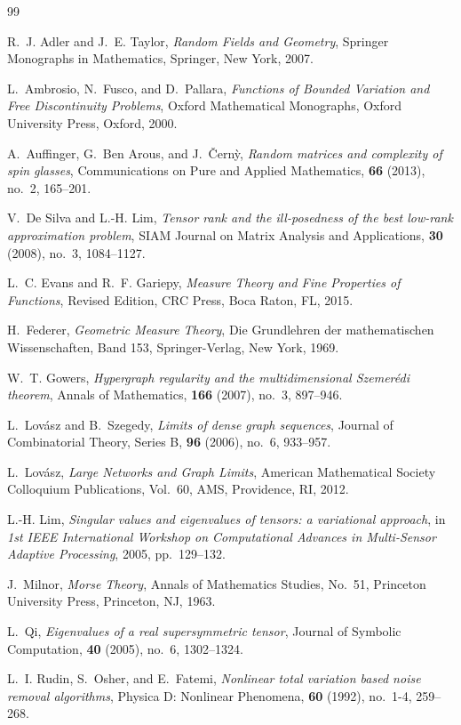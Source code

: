 \documentclass[11pt,a4paper,reqno]{amsart}
\theoremstyle{definition}
\numberwithin{equation}{section}
\begin{document}
\begin{thebibliography}{99}

R.~J. Adler and J.~E. Taylor,
\emph{Random Fields and Geometry},
Springer Monographs in Mathematics, Springer, New York, 2007.

L.~Ambrosio, N.~Fusco, and D.~Pallara,
\emph{Functions of Bounded Variation and Free Discontinuity Problems},
Oxford Mathematical Monographs, Oxford University Press, Oxford, 2000.

A.~Auffinger, G.~Ben Arous, and J.~{\v{C}}ern{\`y},
\emph{Random matrices and complexity of spin glasses},
Communications on Pure and Applied Mathematics, \textbf{66} (2013), no.~2, 165--201.

V.~De Silva and L.-H. Lim,
\emph{Tensor rank and the ill-posedness of the best low-rank approximation problem},
SIAM Journal on Matrix Analysis and Applications, \textbf{30} (2008), no.~3, 1084--1127.

L.~C. Evans and R.~F. Gariepy,
\emph{Measure Theory and Fine Properties of Functions},
Revised Edition, CRC Press, Boca Raton, FL, 2015.

H.~Federer,
\emph{Geometric Measure Theory},
Die Grundlehren der mathematischen Wissenschaften, Band 153, Springer-Verlag, New York, 1969.

W.~T. Gowers,
\emph{Hypergraph regularity and the multidimensional Szemer{\'e}di theorem},
Annals of Mathematics, \textbf{166} (2007), no.~3, 897--946.

L.~Lov{\'a}sz and B.~Szegedy,
\emph{Limits of dense graph sequences},
Journal of Combinatorial Theory, Series B, \textbf{96} (2006), no.~6, 933--957.

L.~Lov{\'a}sz,
\emph{Large Networks and Graph Limits},
American Mathematical Society Colloquium Publications, Vol.~60, AMS, Providence, RI, 2012.

L.-H. Lim,
\emph{Singular values and eigenvalues of tensors: a variational approach},
in \emph{1st IEEE International Workshop on Computational Advances in Multi-Sensor Adaptive Processing}, 2005, pp.~129--132.

J.~Milnor,
\emph{Morse Theory},
Annals of Mathematics Studies, No.~51, Princeton University Press, Princeton, NJ, 1963.

L.~Qi,
\emph{Eigenvalues of a real supersymmetric tensor},
Journal of Symbolic Computation, \textbf{40} (2005), no.~6, 1302--1324.

L.~I. Rudin, S.~Osher, and E.~Fatemi,
\emph{Nonlinear total variation based noise removal algorithms},
Physica D: Nonlinear Phenomena, \textbf{60} (1992), no.~1-4, 259--268.

\end{thebibliography}
\end{document}
